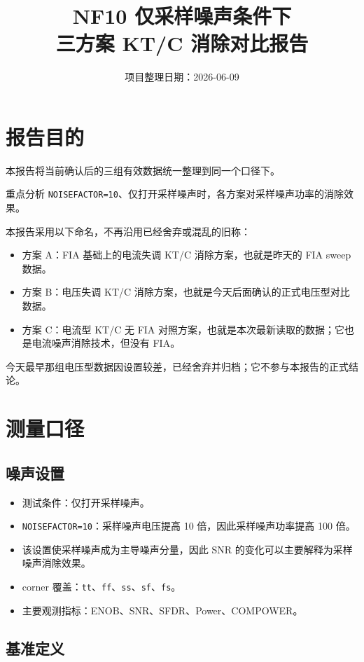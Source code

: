 \documentclass[12pt,a4paper]{ctexart}
\title{\textbf{NF10 仅采样噪声条件下}\\[4pt]\textbf{三方案 KT/C 消除对比报告}}
\author{项目整理日期：2026-06-09}
\date{}
\begin{document}
\maketitle
\tableofcontents
\newpage

\section{报告目的}

本报告将当前确认后的三组有效数据统一整理到同一个口径下。

重点分析 \texttt{NOISEFACTOR=10}、仅打开采样噪声时，各方案对采样噪声功率的消除效果。

本报告采用以下命名，不再沿用已经舍弃或混乱的旧称：

\begin{itemize}
  \item 方案 A：FIA 基础上的电流失调 KT/C 消除方案，也就是昨天的 FIA sweep 数据。
  \item 方案 B：电压失调 KT/C 消除方案，也就是今天后面确认的正式电压型对比数据。
  \item 方案 C：电流型 KT/C 无 FIA 对照方案，也就是本次最新读取的数据；它也是电流噪声消除技术，但没有 FIA。
\end{itemize}

今天最早那组电压型数据因设置较差，已经舍弃并归档；它不参与本报告的正式结论。

\section{测量口径}

\subsection{噪声设置}

\begin{itemize}
  \item 测试条件：仅打开采样噪声。
  \item \texttt{NOISEFACTOR=10}：采样噪声电压提高 10 倍，因此采样噪声功率提高 100 倍。
  \item 该设置使采样噪声成为主导噪声分量，因此 SNR 的变化可以主要解释为采样噪声消除效果。
  \item corner 覆盖：\texttt{tt}、\texttt{ff}、\texttt{ss}、\texttt{sf}、\texttt{fs}。
  \item 主要观测指标：ENOB、SNR、SFDR、Power、COMPOWER。
\end{itemize}

\subsection{基准定义}
\end{document}
